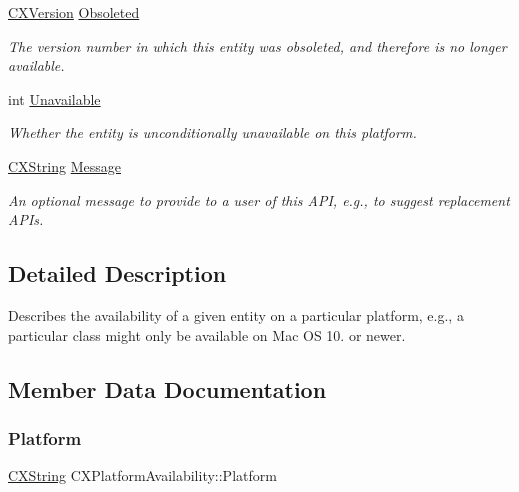 \begin{DoxyCompactItemize}
\hyperlink{structCXVersion}{C\+X\+Version} \hyperlink{structCXPlatformAvailability_a55e178964401575e70088e6ff20ed5da}{Obsoleted}
\begin{DoxyCompactList}\small\item\em The version number in which this entity was obsoleted, and therefore is no longer available. \end{DoxyCompactList}\item 
\mbox{\label{structCXPlatformAvailability_aab40800840259fe995c03fbd1560b6d8}} 
int \hyperlink{structCXPlatformAvailability_aab40800840259fe995c03fbd1560b6d8}{Unavailable}
\begin{DoxyCompactList}\small\item\em Whether the entity is unconditionally unavailable on this platform. \end{DoxyCompactList}\item 
\mbox{\label{structCXPlatformAvailability_a73de247ef29d6384a44742d45d02b915}} 
\hyperlink{structCXString}{C\+X\+String} \hyperlink{structCXPlatformAvailability_a73de247ef29d6384a44742d45d02b915}{Message}
\begin{DoxyCompactList}\small\item\em An optional message to provide to a user of this A\+PI, e.\+g., to suggest replacement A\+P\+Is. \end{DoxyCompactList}\end{DoxyCompactItemize}


\subsection{Detailed Description}
Describes the availability of a given entity on a particular platform, e.\+g., a particular class might only be available on Mac OS 10. or newer. 

\subsection{Member Data Documentation}
\mbox{\label{structCXPlatformAvailability_a4ae9c3ed26d1701f0cd42d6743f3e901}} 
\subsubsection{\texorpdfstring{Platform}{Platform}}
{\footnotesize\ttfamily \hyperlink{structCXString}{C\+X\+String} C\+X\+Platform\+Availability\+::\+Platform}



